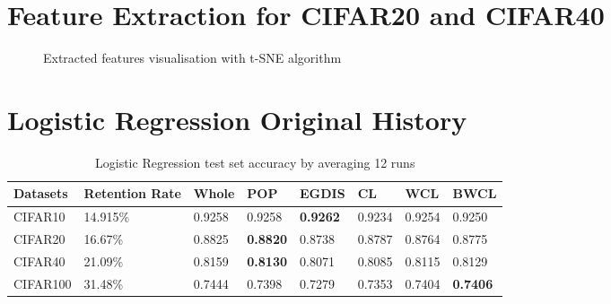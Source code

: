 

\section{Feature Extraction for CIFAR20 and CIFAR40}
\begin{figure}[H]
\centering  
{}
\caption{Extracted features visualisation with t-SNE algorithm}
\label{Fig.tsne2}
\end{figure}

\section{Logistic Regression Original History}

 \begin{table}[H]
    \centering
    \begin{tabular}{|l|l|l|l|l|l|l|l|}
    \hline
        Datasets & Retention Rate & Whole & POP & EGDIS & CL & WCL & BWCL \\ \hline
        CIFAR10 & 14.915\%  & 0.9258 & 0.9258 & \textbf{0.9262} & 0.9234 & 0.9254 & 0.9250 \\ \hline
        CIFAR20 & 16.67\% & 0.8825 & \textbf{0.8820} & 0.8738 & 0.8787 & 0.8764 & 0.8775 \\ \hline
        CIFAR40 & 21.09\% &0.8159 & \textbf{0.8130} & 0.8071 & 0.8085 & 0.8115 & 0.8129 \\ \hline
        CIFAR100 & 31.48\% & 0.7444 & 0.7398 & 0.7279 & 0.7353 & 0.7404 & \textbf{0.7406} \\ \hline
    \end{tabular}
    \caption{Logistic Regression test set accuracy by averaging 12 runs}
    \label{lgtestacc}
\end{table}

